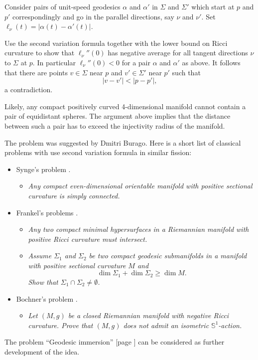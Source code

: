 Consider pairs of unit-speed geodesics $\alpha$ and $\alpha'$ 
in $\Sigma$ and $\Sigma'$  
which start at $p$ and $p'$ correspondingly
and go in the parallel directions, say $\nu$ and $\nu'$. 
Set $\ell_\nu(t)=|\alpha(t)-\alpha'(t)|$.

Use the second variation formula together with the lower bound on Ricci curvature
to show that $\ell_\nu''(0)$ has negative average for all tangent directions $\nu$ to $\Sigma$ at $p$. 
In particular $\ell_\nu''(0)<0$ for a pair $\alpha$ and $\alpha'$ as above.
It follows that there are points $v\in\Sigma$ near $p$ 
and $v'\in\Sigma'$ near $p'$
such that 
\[|v-v'|<|p-p'|,\]
a contradiction.\qeds

Likely, any compact positively curved 
4-dimensional manifold
cannot contain a pair of equidistant spheres.
The argument above implies that the distance between such a pair has to exceed the injectivity radius of the manifold.


The problem was suggested by Dmitri Burago.
Here is a short list of classical problems with use second variation formula in similar fission:
\begin{itemize}
\item Synge's problem \cite[see][]{synge}.
\begin{itemize}
 \item {\it Any compact even-dimensional orientable manifold with positive sectional curvature is
simply connected.}
\end{itemize}
\item Frankel's problems \cite[see][]{frankel}.
\begin{itemize}
\item {\it Any two compact minimal hypersurfaces in a Riemannian manifold with positive Ricci curvature must intersect.}
\item \label{page:frankel} {\it Assume $\Sigma_1$ and $\Sigma_2$ be two compact geodesic submanifolds in a manifold with positive sectional curvature $M$ and 
\[\dim \Sigma_1+\dim \Sigma_2\ge \dim M.\] 
Show that $\Sigma_1\cap\Sigma_2\ne\emptyset$.}
\end{itemize}
\item Bochner's problem \cite[see][]{bochner}.
\begin{itemize}
\item{\it  Let $(M,g)$ be a closed Riemannian manifold with negative Ricci curvature.
Prove that $(M,g)$ does not admit an isometric $\mathbb{S}^1$-action.}
\end{itemize}
\end{itemize}
The problem ``Geodesic immersion'' [page \pageref{Geodesic immersion}] can be considered as further development of the idea.






